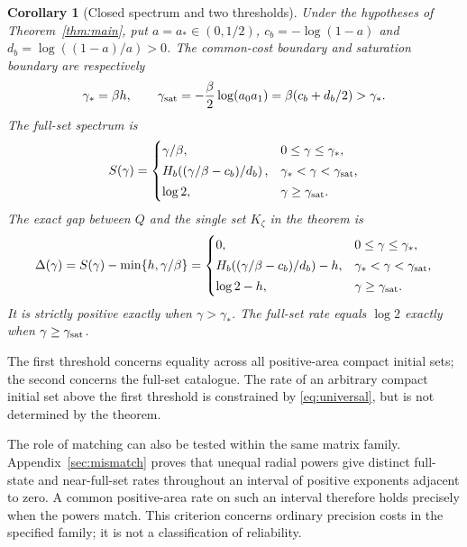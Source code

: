 \documentclass[11pt]{amsart}
\newtheorem{corollary}[theorem]{Corollary}
\theoremstyle{definition}
\theoremstyle{remark}
\numberwithin{equation}{section}
\begin{document}
\begin{corollary}[Closed spectrum and two thresholds]\label{cor:thresholds}
Under the hypotheses of Theorem~\ref{thm:main}, put
$a=a_*\in(0,1/2)$,
$c_b=-\log(1-a)$ and $d_b=\log((1-a)/a)>0$.
The common-cost boundary and saturation boundary are respectively
\begin{equation}\label{eq:thresholds}
\gamma_*=\beta h,\qquad
\gamma_{\rm sat}=-\frac\beta2\log(a_0a_1)
                  =\beta(c_b+d_b/2)>\gamma_*.
\end{equation}
The full-set spectrum is
\begin{equation}\label{eq:closed}
S(\gamma)=
\begin{cases}
\gamma/\beta,&0\le\gamma\le\gamma_*,\\[2pt]
H_b\!\left((\gamma/\beta-c_b)/d_b\right),
      &\gamma_*<\gamma<\gamma_{\rm sat},\\[2pt]
\log2,&\gamma\ge\gamma_{\rm sat}.
\end{cases}
\end{equation}
The exact gap between $Q$ and the single set $K_\zeta$ in the theorem is
\begin{equation}\label{eq:gap}
\Delta(\gamma)=S(\gamma)-\min\{h,\gamma/\beta\}=
\begin{cases}
0,&0\le\gamma\le\gamma_*,\\[2pt]
H_b\!\left((\gamma/\beta-c_b)/d_b\right)-h,
      &\gamma_*<\gamma<\gamma_{\rm sat},\\[2pt]
\log2-h,&\gamma\ge\gamma_{\rm sat}.
\end{cases}
\end{equation}
It is strictly positive exactly when $\gamma>\gamma_*$.
The full-set rate equals $\log2$ exactly when
$\gamma\ge\gamma_{\rm sat}$.
\end{corollary}

The first threshold concerns equality across all positive-area
compact initial sets; the second concerns the full-set catalogue.
The rate of an arbitrary compact initial set above the first
threshold is constrained by \eqref{eq:universal}, but is not
determined by the theorem.

The role of matching can also be tested within the same matrix
family. Appendix~\ref{sec:mismatch} proves that unequal radial
powers give distinct full-state and near-full-set rates throughout
an interval of positive exponents adjacent to zero. A common
positive-area rate on such an interval therefore holds precisely
when the powers match. This criterion concerns ordinary precision costs in the
specified family; it is not a classification of reliability.
\end{document}
